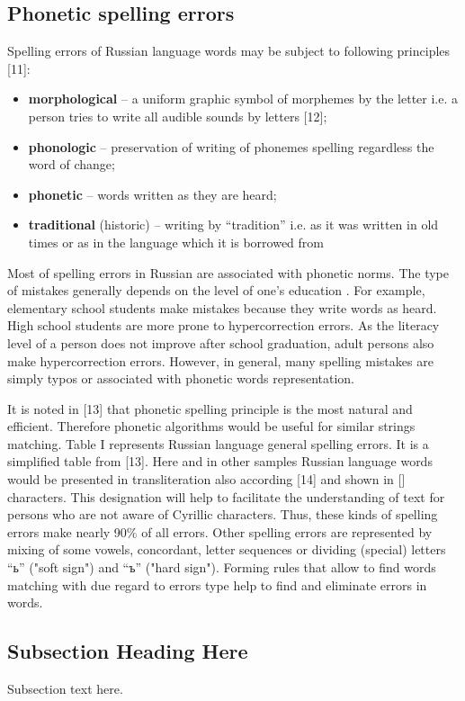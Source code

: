 \documentclass[conference,a4paper]{IEEEtran}
\begin{document}
\subsection{Phonetic spelling errors}
Spelling errors of Russian language words may be subject to following principles [11]:
\begin{itemize}
\item \textbf{morphological} – a uniform graphic symbol of morphemes by the letter i.e. a person tries to write all audible sounds by letters [12];
\item \textbf{phonologic} – preservation of writing of phonemes spelling regardless the word of change;
\item \textbf{phonetic} – words written as they are heard;
\item \textbf{traditional} (historic) – writing by “tradition” i.e. as it was written in old times or as in the language which it is borrowed from
\end{itemize}

Most of spelling errors in Russian are associated with phonetic norms. The type of mistakes generally depends on the level of one’s education \cite{Parubchenko-2005}. For example, elementary school students make mistakes because they write words as heard. High school students are more prone to hypercorrection errors. As the literacy level of a person does not improve after school graduation, adult persons also make hypercorrection errors. However, in general, many spelling mistakes are simply typos or associated with phonetic words representation.

It is noted in [13] that phonetic spelling principle is the most natural and efficient. Therefore  phonetic algorithms would be useful for similar strings matching. Table I represents Russian language general spelling errors. It is a simplified table from [13]. Here and in other samples Russian language words would be presented in transliteration also according [14] and shown in [] characters. This designation will help to facilitate the understanding of text for persons who are not aware of Cyrillic characters.
Thus, these kinds of spelling errors make nearly 90\% of all errors. Other spelling errors are represented by mixing of some vowels, concordant, letter sequences or dividing (special) letters “ь” ("soft sign") and “ъ” ("hard sign"). Forming rules that allow to find words matching with due regard to errors type help to find and eliminate errors in words.

\subsection{Subsection Heading Here}
Subsection text here.
\end{document}
